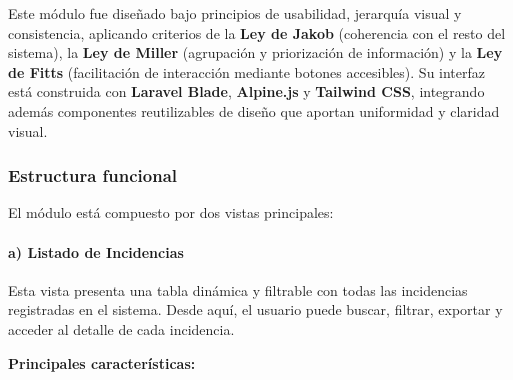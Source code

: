 Este módulo fue diseñado bajo principios de usabilidad, jerarquía visual y consistencia, aplicando criterios de la \textbf{Ley de Jakob} (coherencia con el resto del sistema), la \textbf{Ley de Miller} (agrupación y priorización de información) y la \textbf{Ley de Fitts} (facilitación de interacción mediante botones accesibles). Su interfaz está construida con \textbf{Laravel Blade}, \textbf{Alpine.js} y \textbf{Tailwind CSS}, integrando además componentes reutilizables de diseño que aportan uniformidad y claridad visual.

\subsubsection{Estructura funcional}

El módulo está compuesto por dos vistas principales:

\paragraph{a) Listado de Incidencias}

Esta vista presenta una tabla dinámica y filtrable con todas las incidencias registradas en el sistema. Desde aquí, el usuario puede buscar, filtrar, exportar y acceder al detalle de cada incidencia.

\textbf{Principales características:}

